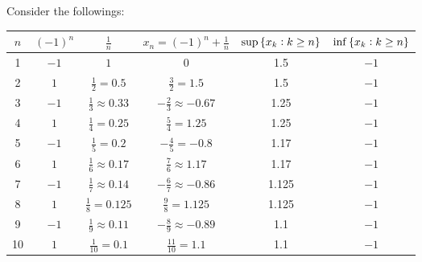 \documentclass[11pt,openany]{article}
\begin{document}
\begin{observation}
Consider the followings:
\begin{table}[h]
\centering{}
\begin{tabular}{c|cc|c||cc}
	\toprule
	\(n\) & \((-1)^n\) & \(\frac{1}{n}\) & \(x_n=(-1)^n + \frac{1}{n}\) & $\sup\set{x_k:k\geq n}$ & $\inf\set{x_k:k\geq n}$ \\
	\midrule
	1  & \(-1\)   & \(1\)       & \(0\) & 1.5 & $-1$ \\
	2  & \(1\)    & \(\tfrac{1}{2}=0.5\)  & \(\tfrac{3}{2}=1.5\) & 1.5 & $-1$   \\
	3  & \(-1\)   & \(\tfrac{1}{3}\approx 0.33\)  & \(-\tfrac{2}{3}\approx -0.67\) & 1.25 & $-1$  \\
	4  & \(1\)    & \(\tfrac{1}{4}=0.25\)  & \(\tfrac{5}{4}=1.25\) & 1.25 & $-1$   \\
	5  & \(-1\)   & \(\tfrac{1}{5}=0.2\)  & \(-\tfrac{4}{5}=-0.8\) & 1.17 & $-1$  \\
	6  & \(1\)    & \(\tfrac{1}{6}\approx 0.17\)  & \(\tfrac{7}{6}\approx 1.17\) & 1.17 & $-1$   \\
	7  & \(-1\)   & \(\tfrac{1}{7}\approx 0.14\)  & \(-\tfrac{6}{7}\approx -0.86\) & 1.125 & $-1$  \\
	8  & \(1\)    & \(\tfrac{1}{8}=0.125\)  & \(\tfrac{9}{8}=1.125\) & 1.125 & $-1$   \\
	9  & \(-1\)   & \(\tfrac{1}{9}\approx 0.11\)  & \(-\tfrac{8}{9}\approx -0.89\) & 1.1 & $-1$  \\
	10 & \(1\)    & \(\tfrac{1}{10}=0.1\) & \(\tfrac{11}{10}=1.1\) & 1.1 & $-1$ \\
	\bottomrule
\end{tabular}
\end{table}

\begin{center}
\end{center}
\end{observation}
\end{document}
